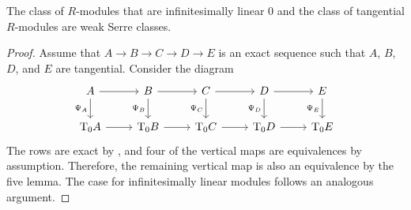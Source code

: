 \begin{proposition}\label{prp:op-closure-inf-lin-tangential}
  The class of $R$-modules that are infinitesimally linear $0$ and the class of tangential $R$-modules are weak Serre classes.
\end{proposition}

\begin{proof}
  Assume that $A \to B \to C \to D \to E$ is an exact sequence such that $A$, $B$, $D$, and $E$ are tangential. Consider the diagram
      \[
    \begin{tikzcd}
    A \ar{d}[left]{\Psi_A} \ar{r} &  B \ar{d}[left]{\Psi_B} \ar{r} & C \ar{r} \ar{d}[left]{\Psi_C} & D \ar{r} \ar{d}[left]{\Psi_D} & E \ar{d}[left]{\Psi_E}\\
    \tangent{A}{0} \ar{r} &  \tangent{B}{0} \ar{r} & \tangent{C}{0} \ar{r} & \tangent{D}{0}\ar{r} & \tangent{E}{0}
    \end{tikzcd}
    \]
    The rows are exact by , and four of the vertical maps are equivalences by assumption.
    Therefore, the remaining vertical map is also an equivalence by the five lemma.
    The case for infinitesimally linear modules follows an analogous argument.
\end{proof}
